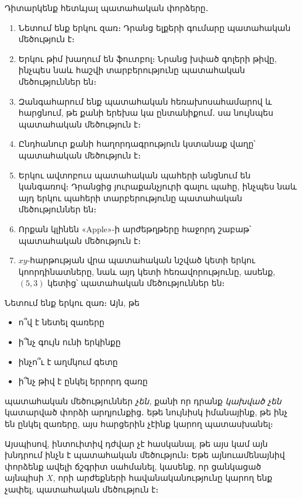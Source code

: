 \begin{example}\label{rv_examples}
Դիտարկենք հետևյալ պատահական փորձերը․

\begin{enumerate}
\item Նետում ենք երկու զառ։ Դրանց ելքերի գումարը պատահական մեծություն է։

\item Երկու թիմ խաղում են ֆուտբոլ։ Նրանց խփած գոլերի թիվը, ինչպես նաև հաշվի տարբերությունը պատահական մեծու\-թյուններ են։ 

\item Զանգահարում ենք պատահական հեռախոսահամարով և հարցնում, թե քանի երեխա կա ընտանիքում․ սա նույնպես պատա\-հական մեծություն է։

\item Ընդհանուր քանի հաղորդագրություն կստանաք վաղը՝ պատա\-հական մեծություն է։

\item Երկու ավտոբուս պատահական պահերի անցնում են կանգառով։ Դրանցից յուրաքանչյուրի գալու պահը, ինչպես նաև այդ երկու պահերի տարբերությունը պատահական մեծություններ են։

\item Որքան կլինեն «{\rm Apple}»-ի արժեթղթերը հաջորդ շաբաթ՝ պատահական մեծություն է։

\item $xy$-հարթության վրա պատահական նշված կետի երկու կոոր\-դի\-նատները, նաև այդ կետի հեռավորությունը, ասենք, $(5, 3)$ կետից՝ պատահական մեծություններ են։
\end{enumerate}
\end{example}


\begin{example}
Նետում ենք երկու զառ։ Այն, թե
\begin{itemize}
    \item ո՞վ է նետել զառերը
    \item ի՞նչ գույն ունի երկինքը
    \item ինչո՞ւ է աղմկում գետը
    \item ի՞նչ թիվ է ընկել երրորդ զառը
\end{itemize}
պատահական մեծություններ \textit{չեն,} քանի որ դրանք \textit{կախված չեն} կատարված փորձի արդյունքից․ եթե նույնիսկ իմանայինք, թե ինչ են ընկել զառերը, այս հարցերին չէինք կարող պատասխանել։
\end{example}

Այսպիսով, ինտուիտիվ դժվար չէ հասկանալ, թե այս կամ այն խնդրում ինչն է պատահական մեծություն։ 
Եթե այնուամենայնիվ փորձենք ավելի ճշգրիտ սահմանել, կասենք, որ ցանկացած այնպիսի $X$, որի արժեքների հավանականությունը կարող ենք չափել, պատահական մեծություն է։

